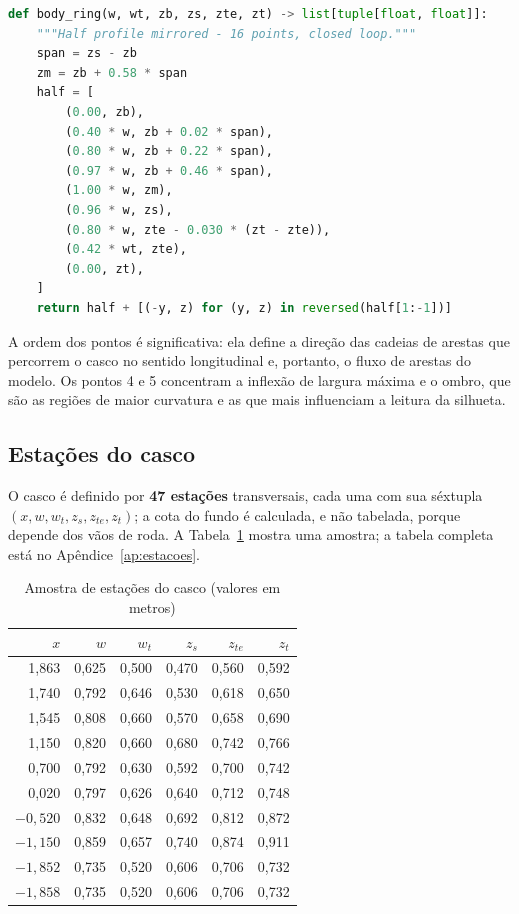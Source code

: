 \begin{lstlisting}[language=Python]
def body_ring(w, wt, zb, zs, zte, zt) -> list[tuple[float, float]]:
    """Half profile mirrored - 16 points, closed loop."""
    span = zs - zb
    zm = zb + 0.58 * span
    half = [
        (0.00, zb),
        (0.40 * w, zb + 0.02 * span),
        (0.80 * w, zb + 0.22 * span),
        (0.97 * w, zb + 0.46 * span),
        (1.00 * w, zm),
        (0.96 * w, zs),
        (0.80 * w, zte - 0.030 * (zt - zte)),
        (0.42 * wt, zte),
        (0.00, zt),
    ]
    return half + [(-y, z) for (y, z) in reversed(half[1:-1])]
\end{lstlisting}

A ordem dos pontos \'e significativa: ela define a dire{\c{c}}\~ao das cadeias de arestas que
percorrem o casco no sentido longitudinal e, portanto, o fluxo de arestas do modelo. Os pontos
4 e 5 concentram a inflex\~ao de largura m\'axima e o ombro, que s\~ao as regi\~oes de maior
curvatura e as que mais influenciam a leitura da silhueta.

\subsection{Esta{\c{c}}\~oes do casco}

O casco \'e definido por \textbf{47 esta{\c{c}}\~oes} transversais, cada uma com sua
s\'extupla $(x, w, w_t, z_s, z_{te}, z_t)$; a cota do fundo \'e calculada, e n\~ao tabelada,
porque depende dos v\~aos de roda. A Tabela~\ref{tab:estacoes-amostra} mostra uma amostra; a
tabela completa est\'a no Ap\^endice~\ref{ap:estacoes}.

\begin{table}[htbp]
\centering
\caption{Amostra de esta{\c{c}}\~oes do casco (valores em metros)}
\label{tab:estacoes-amostra}
\footnotesize
\begin{tabular}{rrrrrr}
\toprule
\textbf{$x$} & \textbf{$w$} & \textbf{$w_t$} & \textbf{$z_s$} & \textbf{$z_{te}$} & \textbf{$z_t$} \\
\midrule
1,863 & 0,625 & 0,500 & 0,470 & 0,560 & 0,592 \\
1,740 & 0,792 & 0,646 & 0,530 & 0,618 & 0,650 \\
1,545 & 0,808 & 0,660 & 0,570 & 0,658 & 0,690 \\
1,150 & 0,820 & 0,660 & 0,680 & 0,742 & 0,766 \\
0,700 & 0,792 & 0,630 & 0,592 & 0,700 & 0,742 \\
0,020 & 0,797 & 0,626 & 0,640 & 0,712 & 0,748 \\
$-0,520$ & 0,832 & 0,648 & 0,692 & 0,812 & 0,872 \\
$-1,150$ & 0,859 & 0,657 & 0,740 & 0,874 & 0,911 \\
$-1,852$ & 0,735 & 0,520 & 0,606 & 0,706 & 0,732 \\
$-1,858$ & 0,735 & 0,520 & 0,606 & 0,706 & 0,732 \\
\bottomrule
\end{tabular}
\end{table}

